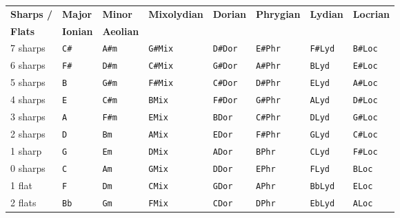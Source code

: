 \documentclass[a4paper,12pt]{book}
\begin{document}
\begin{table}[h]
\centering
\begin{tabular}{llllllll}
\toprule %
\textbf{Sharps /} & \textbf{Major} & \textbf{Minor} & \textbf{Mixolydian} &
\textbf{Dorian}  & \textbf{Phrygian} & \textbf{Lydian} & \textbf{Locrian} \\
\textbf{Flats}   & \textbf{Ionian} & \textbf{Aeolian} & ~ & ~ & ~ & ~ & ~ \\
\midrule %
7 sharps & \texttt{C\#} &  \texttt{A\#m} & \texttt{G\#Mix} &
\texttt{D\#Dor} & \texttt{E\#Phr} & \texttt{F\#Lyd} & \texttt{B\#Loc} \\

6 sharps & \texttt{F\#} &  \texttt{D\#m} & \texttt{C\#Mix} &
\texttt{G\#Dor} & \texttt{A\#Phr} & \texttt{BLyd}   & \texttt{E\#Loc} \\

5 sharps & \texttt{B}   &  \texttt{G\#m} & \texttt{F\#Mix} &
\texttt{C\#Dor} & \texttt{D\#Phr} & \texttt{ELyd}   & \texttt{A\#Loc} \\

4 sharps & \texttt{E}   &  \texttt{C\#m} & \texttt{BMix}   &
\texttt{F\#Dor} & \texttt{G\#Phr} & \texttt{ALyd}   & \texttt{D\#Loc} \\

3 sharps & \texttt{A}   &  \texttt{F\#m} & \texttt{EMix}   &
\texttt{BDor}   & \texttt{C\#Phr} & \texttt{DLyd}   & \texttt{G\#Loc} \\

2 sharps & \texttt{D}   &  \texttt{Bm}   & \texttt{AMix}   &
\texttt{EDor}   & \texttt{F\#Phr} & \texttt{GLyd}   & \texttt{C\#Loc} \\

1 sharp  & \texttt{G}   &  \texttt{Em}   & \texttt{DMix}   &
\texttt{ADor}   & \texttt{BPhr}   & \texttt{CLyd}   & \texttt{F\#Loc} \\

0 sharps & \texttt{C}   &  \texttt{Am}   & \texttt{GMix}   &
\texttt{DDor}   & \texttt{EPhr}   & \texttt{FLyd}   & \texttt{BLoc} \\

1 flat   & \texttt{F}   &  \texttt{Dm}   & \texttt{CMix}   &
\texttt{GDor}   & \texttt{APhr}   & \texttt{BbLyd}  & \texttt{ELoc} \\

2 flats  & \texttt{Bb}  &  \texttt{Gm}   & \texttt{FMix}   &
\texttt{CDor}   & \texttt{DPhr}   & \texttt{EbLyd}  & \texttt{ALoc} \\


\end{tabular}
\end{table}
\end{document}

